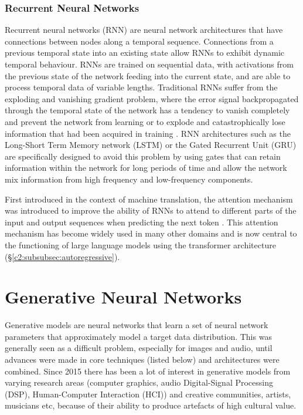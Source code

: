 \subsubsection{Recurrent Neural Networks}
\label{c2:subsubsec:rnn}

Recurrent neural networks (RNN) are neural network architectures that have connections between nodes along a temporal sequence. 
Connections from a previous temporal state into an existing state allow RNNs to exhibit dynamic temporal behaviour. RNNs are trained on sequential data, with activations from the previous state of the network feeding into the current state, and are able to process temporal data of variable lengths. 
Traditional RNNs suffer from the exploding and vanishing gradient problem, where the error signal backpropagated through the temporal state of the network has a tendency to vanish completely and prevent the network from learning or to explode and catastrophically lose information that had been acquired in training \citep{hochreiter1998vanishing}. 
RNN architectures such as the Long-Short Term Memory network (LSTM) \citep{hochreiter1997long} or the Gated Recurrent Unit (GRU) \citep{cho2014properties} are specifically designed to avoid this problem by using gates that can retain information within the network for long periods of time and allow the network mix information from high frequency and low-frequency components. 

First introduced in the context of machine translation, the attention mechanism was introduced to improve the ability of RNNs to attend to different parts of the input and output sequences when predicting the next token \citep{bahdanau2014neural}. 
This attention mechanism has become widely used in many other domains and is now central to the functioning of large language models using the transformer architecture (\S \ref{c2:subsubsec:autoregressive}).

 
\section{Generative Neural Networks}
\label{c2:sec:gen-nn}

Generative models are neural networks that learn a set of neural network parameters that approximately model a target data distribution. 
This was generally seen as a difficult problem, especially for images and audio, until advances were made in core techniques (listed below) and architectures were combined. 
Since 2015 there has been a lot of interest in generative models from varying research areas (computer graphics, audio Digital-Signal Processing (DSP), Human-Computer Interaction (HCI)) and creative communities, artists, musicians etc, because of their ability to produce artefacts of high cultural value. 

